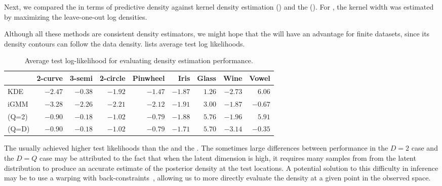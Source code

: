 Next, we compared the \iwmm{} in terms of predictive density against kernel density estimation (\KDE{}) and the (\iGMM{}).
For \KDE{}, the kernel width was estimated by maximizing the leave-one-out log densities.

Although all these methods are consistent density estimators, we might hope that the \iwmm{} will have an advantage for finite datasets, since its density contours can follow the data density.
%
 lists average test log likelihoods.
%
\begin{table}[ht!]
\centering
\caption[Predictive log-likelihood comparison]
{Average test log-likelihood for evaluating density estimation performance.}
\label{tab:likelihood}
\begin{tabular}{lrrrrrrrr}
\hline
& 2-curve & 3-semi & 2-circle & Pinwheel & Iris  & Glass  & Wine  & Vowel  \\
\hline 
KDE & $-2.47$ & $-0.38$ & $-1.92$ & $-1.47$ & $\mathbf{-1.87}$ & $1.26$ & $-2.73$ & $\mathbf{6.06}$ \\
iGMM & $-3.28$ & $-2.26$ & $-2.21$ & $-2.12$ & $-1.91$ & $3.00$ & $\mathbf{-1.87}$ & $-0.67$ \\
\iwmm{}(Q=2) & $\mathbf{-0.90}$ & $\mathbf{-0.18}$ & $\mathbf{-1.02}$ & $\mathbf{-0.79}$ & $\mathbf{-1.88}$ & $\mathbf{5.76}$ & $\mathbf{-1.96}$ & $\mathbf{5.91}$ \\
\iwmm{}(Q=D) & $\mathbf{-0.90}$ & $\mathbf{-0.18}$ & $\mathbf{-1.02}$ & $\mathbf{-0.79}$ & $\mathbf{-1.71}$ & $\mathbf{5.70}$ & $-3.14$ & $-0.35$ \\
\hline
\end{tabular}
\end{table}


The \iwmm{} usually achieved higher test likelihoods than the \KDE{} and the \iGMM{}.
%
The sometimes large differences between performance in the $D = 2$ case and the $D = Q$ case may be attributed to the fact that when the latent dimension is high, it requires many samples from from the latent distribution to produce an accurate estimate of the posterior density at the test locations.
A potential solution to this difficulty in inference may be to use a warping with back-constraints~\citep{Lawrence06localdistance}, allowing us to more directly evaluate the density at a given point in the observed space.




